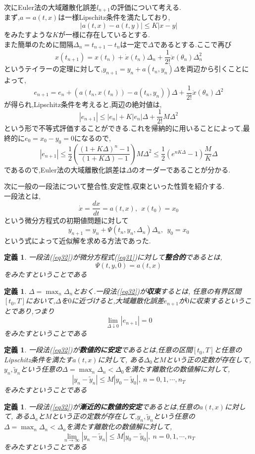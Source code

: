 \documentclass[a4paper]{jreport}
\numberwithin{equation}{section}
\newtheorem{Def}     [Thm]{定義}
\renewenvironment{leftbar}{%
  \def\FrameCommand{\vrule width 1pt \hspace{10pt}}%
  \MakeFramed {\advance\hsize-\width \FrameRestore}}%
 {\endMakeFramed}
\def\defb{\begin{leftbar}\begin{Def}}
\def\defx{\end{Def}\end{leftbar}}
\def\eq{\begin{equation}}
\def\eqx{\end{equation}}
\begin{document}
次にEuler法の大域離散化誤差$l_{n+1}$の評価について考える.\\
まず,$a=a(t,x)$は一様Lipschitz条件を満たしており,
\[
|a(t,x) - a(t,y)| \le K |x-y|
\]
をみたすような$K$が一様に存在しているとする.\\
また簡単のために間隔$\Delta_n = t_{n+1} -t_n$は一定で$\Delta$であるとする.ここで再び
\[
x(t_{n+1}) = x(t_n) + \dot{x}(t_n)\Delta_n + \frac{1}{2!} \ddot{x}(\theta_n)\Delta_n^2
\]
というテイラーの定理に対して,$y_{n+1} = y_n + a(t_n,y_n)\Delta $を両辺から引くことによって,
\[
e_{n+1} = e_n + (a(t_n,x(t_n))-a(t_n,y_n))\Delta + \frac{1}{2!} \ddot{x}(\theta_n)\Delta^2
\]
が得られ,Lipschitz条件を考えると,両辺の絶対値は,
\[
|e_{n+1}| \le |e_n| + K|e_n|\Delta + \frac{1}{2!} M\Delta^2
\]
という形で不等式評価することができる.これを帰納的に用いることによって,最終的に$e_0 = x_0 - y_0 = 0$になるので,
\[
|e_{n+1}| \le \frac{1}{2} \left( \frac{(1+K\Delta)^n -1 }{(1+K\Delta)-1} \right)M\Delta^2 \le
\frac{1}{2} (e^{nK\Delta} -1) \frac{M}{K}\Delta
\]
であるので,Euler法の大域離散化誤差は$\Delta$のオーダーであることが分かる.\par
次に一般の一段法について整合性,安定性,収束といった性質を紹介する.\\
一段法とは,
\eq
\label{eq31}
\dot{x} = \frac{dx}{dt} = a(t,x), \  \  x(t_0) = x_0
\eqx
という微分方程式の初期値問題に対して
\eq
\label{eq32}
y_{n+1} = y_n + \Psi(t_n,y_n,\Delta_n) \Delta_n,\  \  y_0 = x_0
\eqx
という式によって近似解を求める方法であった.\\
\defb
一段法(\ref{eq32})が微分方程式(\ref{eq31})に対して{\bf 整合的}であるとは,\\
\[
\Psi(t,y,0)  = a(t,x)
\]
をみたすということである
\defx

\defb
$\Delta =\max_n \Delta_n$とおく.一段法(\ref{eq32})が{\bf 収束}するとは,
任意の有界区間$[t_0,T]$において,$\Delta$を$0$に近づけると,大域離散化誤差$e_{n+1}$が$0$に収束するということであり,つまり\\
\[
\lim_{\Delta \downarrow 0} |e_{n+1}| = 0
\]
をみたすということである
\defx

\defb
一段法(\ref{eq32})が{\bf 数値的に安定}であるとは,任意の区間$[t_0,T]$と任意のLipschitz条件を満たす$a(t,x)$に対して,
ある$\Delta_0$と$M$という正の定数が存在して,$y_n,\tilde{y}_n$という任意の$\Delta =\max_n \Delta_n < \Delta_0$を満たす離散化の数値解に対して,
\[
|y_n - \tilde{y}_n | \le M |y_0 - \tilde{y}_0| ,\ n = 0,1,\cdots,n_T
\]
をみたすということである
\defx

\defb
一段法(\ref{eq32})が{\bf 漸近的に数値的安定}であるとは,任意の$a(t,x)$に対して,
ある$\Delta_a$と$M$という正の定数が存在して,$y_n,\tilde{y}_n$という任意の$\Delta =\max_n \Delta_n < \Delta_a$を満たす離散化の数値解に対して,
\[
\lim_{n\to\infty}|y_n - \tilde{y}_n | \le M |y_0 - \tilde{y}_0| ,\ n = 0,1,\cdots,n_T
\]
をみたすということである
\defx
\end{document}
